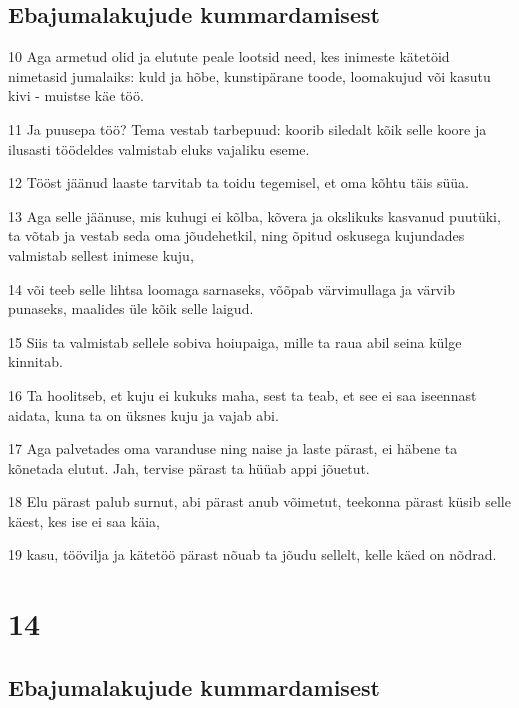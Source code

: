 \section*{Ebajumalakujude kummardamisest}

\par 10 Aga armetud olid ja elutute peale lootsid need, kes inimeste kätetöid nimetasid jumalaiks: kuld ja hõbe, kunstipärane toode, loomakujud või kasutu kivi - muistse käe töö.
\par 11 Ja puusepa töö? Tema vestab tarbepuud: koorib siledalt kõik selle koore ja ilusasti töödeldes valmistab eluks vajaliku eseme.
\par 12 Tööst jäänud laaste tarvitab ta toidu tegemisel, et oma kõhtu täis süüa.
\par 13 Aga selle jäänuse, mis kuhugi ei kõlba, kõvera ja okslikuks kasvanud puutüki, ta võtab ja vestab seda oma jõudehetkil, ning õpitud oskusega kujundades valmistab sellest inimese kuju,
\par 14 või teeb selle lihtsa loomaga sarnaseks, võõpab värvimullaga ja värvib punaseks, maalides üle kõik selle laigud.
\par 15 Siis ta valmistab sellele sobiva hoiupaiga, mille ta raua abil seina külge kinnitab.
\par 16 Ta hoolitseb, et kuju ei kukuks maha, sest ta teab, et see ei saa iseennast aidata, kuna ta on üksnes kuju ja vajab abi.
\par 17 Aga palvetades oma varanduse ning naise ja laste pärast, ei häbene ta kõnetada elutut. Jah, tervise pärast ta hüüab appi jõuetut.
\par 18 Elu pärast palub surnut, abi pärast anub võimetut, teekonna pärast küsib selle käest, kes ise ei saa käia,
\par 19 kasu, töövilja ja kätetöö pärast nõuab ta jõudu sellelt, kelle käed on nõdrad.

\chapter{14}

\section*{Ebajumalakujude kummardamisest}

